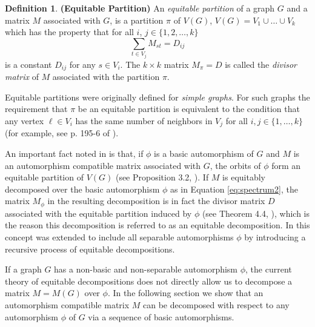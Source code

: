\documentclass[preprint,12pt]{elsarticle}
\newcommand{\defital}{\textit}
\theoremstyle{definition}
\newtheorem{defn}[thm]{Definition}
\theoremstyle{remark}
\renewcommand{\emph}{\textit}
\begin{document}
\begin{defn}\label{def:EP}\textbf{(Equitable Partition)}
An \emph{equitable partition} of a graph $G$ and a matrix $M$ associated with $G$, is a partition $\pi$ of $V(G)$, $V(G) = V_1 \cup \ldots \cup V_k$ which has the property that for all $i$, $j \in \{1, 2, \ldots, k\}$
\begin{equation}\label{eq:1}
\sum_{t \in V_j} M_{st} = D_{ij}
\end{equation}
is a constant $D_{ij}$ for any  $s \in V_i$. The $k \times k$ matrix $M_\pi = D
$ is called the \defital{divisor matrix} of $M$ associated with the partition $\pi$.
\end{defn}

Equitable partitions were originally defined for \emph{simple graphs}. For such graphs the requirement that $\pi$ be an equitable partition is equivalent to the condition that any vertex $\ell \in V_i$ has the same number of neighbors in $V_j$ for all $i,j \in \{1, \ldots, k\}$ (for example, see p. 195-6 of  \cite{Godsil}).

An important fact noted in \cite{BFW} is that, if $\phi$ is a basic automorphism of $G$ and $M$ is an automorphism compatible matrix associated with $G$, the orbits of $\phi$ form an equitable partition of $V(G)$ (see Proposition 3.2, \cite{BFW}). If $M$ is equitably decomposed over the basic automorphism $\phi$ as in Equation \eqref{eq:spectrum2}, the matrix $M_\phi$ in the resulting decomposition is in fact the divisor matrix $D$ associated with the equitable partition induced by $\phi$ (see Theorem 4.4, \cite{BFW}), which is the reason this decomposition is referred to as an equitable decomposition. In \cite{FSSW} this concept was extended to include all separable automorphisms $\phi$ by introducing a recursive process of equitable decompositions.

If a graph $G$ has a non-basic and non-separable automorphism $\phi$, the current theory of equitable decompositions does not directly allow us to decompose a matrix $M=M(G)$ over $\phi$. In the following section we show that an automorphism compatible matrix $M$ can be decomposed with respect to any automorphism $\phi$ of $G$ via a sequence of basic automorphisms.
\end{document}
